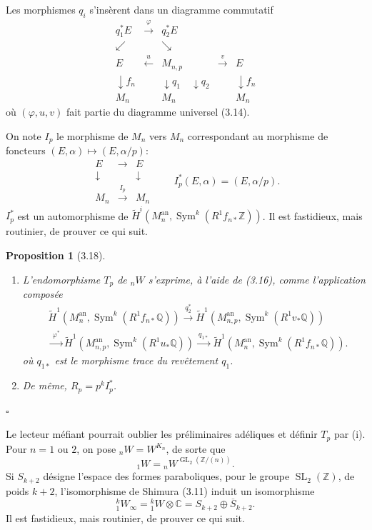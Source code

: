 \documentclass[10pt]{article}
\newcommand{\C}{\mathbb C}
\newcommand{\Q}{\mathbb Q}
\newcommand{\Z}{\mathbb Z}
\newcommand{\GL}{\operatorname{GL}}
\newcommand{\SL}{\operatorname{SL}}
\newcommand{\Sym}{\operatorname{Sym}}
\newcommand{\an}{\mathrm{an}}
\newcommand{\QED}{\hfill$\square$}
\newtheorem*{proposition}{Proposition}
\begin{document}
Les morphismes $q_i$ s'insèrent dans un diagramme commutatif
\[
\begin{array}{ccccc}
q_1^*E & \xrightarrow{\ \varphi\ } & q_2^*E &&\\[-0.2em]
\swarrow && \searrow &&\\[-0.2em]
E & \xleftarrow{\ u\ } & M_{n,p} & \xrightarrow{\ v\ } & E\\[-0.2em]
\downarrow f_n && \downarrow q_1\quad\downarrow q_2 && \downarrow f_n\\[-0.2em]
M_n && M_n && M_n
\end{array}
\tag{3.16}
\]
où $(\varphi,u,v)$ fait partie du diagramme universel (3.14).

On note $I_p$ le morphisme de $M_n$ vers $M_n$ correspondant au morphisme de foncteurs $(E,\alpha)\mapsto(E,\alpha/p)$:
\[
\begin{array}{ccc}
E&\longrightarrow&E\\
\downarrow&&\downarrow\\
M_n&\xrightarrow{\ I_p\ }&M_n
\end{array}
\qquad
I_p^*(E,\alpha)=(E,\alpha/p).
\tag{3.17}
\]
$I_p^*$ est un automorphisme de $\widetilde H^i(M_n^{\an},\Sym^k(R^1f_{n*}\Z))$. Il est fastidieux, mais routinier, de prouver ce qui suit.

\begin{proposition}[3.18]
\leavevmode
\begin{enumerate}[label=(\roman*)]
\item L'endomorphisme $T_p$ de ${}_nW$ s'exprime, à l'aide de (3.16), comme l'application composée
\[
\begin{aligned}
&\widetilde H^1(M_n^{\an},\Sym^k(R^1f_{n*}\Q))
\xrightarrow{\ q_2^*\ }
\widetilde H^1(M_{n,p}^{\an},\Sym^k(R^1v_*\Q))\\
&\xrightarrow{\ \varphi^*\ }
\widetilde H^1(M_{n,p}^{\an},\Sym^k(R^1u_*\Q))
\xrightarrow{\ q_{1*}\ }
\widetilde H^1(M_n^{\an},\Sym^k(R^1f_{n*}\Q)).
\end{aligned}
\]
où $q_{1*}$ est le morphisme trace du revêtement $q_1$.
\item De même, $R_p=p^kI_p^*$.
\end{enumerate}
\end{proposition}
\QED

Le lecteur méfiant pourrait oublier les préliminaires adéliques et définir $T_p$ par (i). Pour $n=1$ ou $2$, on pose ${}_nW=W^{K_n}$, de sorte que
\[
{}_1W={}_nW^{\GL_2(\Z/(n))}.
\]
Si $S_{k+2}$ désigne l'espace des formes paraboliques, pour le groupe $\SL_2(\Z)$, de poids $k+2$, l'isomorphisme de Shimura (3.11) induit un isomorphisme
\[
{}^k_1W_\infty={}^k_1W\otimes\C=S_{k+2}\oplus \overline{S}_{k+2}.
\]
Il est fastidieux, mais routinier, de prouver ce qui suit.
\end{document}
